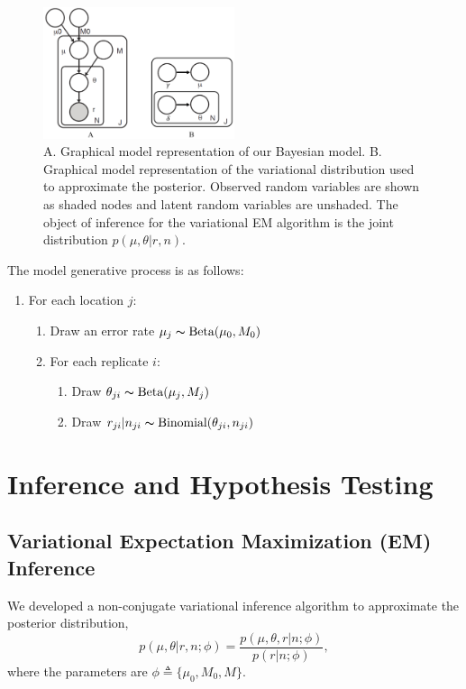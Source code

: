 \documentclass[11pt,reqno]{amsart}
\begin{document}
\begin{figure}[htpb]
\centering
\includegraphics[width=0.5\textwidth]{figs/rvd3_model.png}
\caption{A. Graphical model representation of our Bayesian model.
B. Graphical model representation of the variational distribution used to approximate the posterior.
Observed random variables are shown as shaded nodes and latent random variables are unshaded.
The object of inference for the variational EM algorithm is the joint distribution $p(\mu, \theta|r, n)$.}
\label{tbl:graphical_model}
\end{figure}
The model generative process is as follows:
\begin{enumerate}[noitemsep]
	\item For each location $j$:
	\begin{enumerate}
		\item Draw an error rate $\mu_j \thicksim \text{Beta}(\mu_0, M_0)$
		\item For each replicate $i$:
		\begin{enumerate}
			\item Draw $\theta_{ji} \thicksim \text{Beta}(\mu_j, M_j)$
			\item Draw $r_{ji} | n_{ji} \thicksim \text{Binomial}(\theta_{ji}, n_{ji})$
		\end{enumerate}
	\end{enumerate}
\end{enumerate}

\section{Inference and Hypothesis Testing}
\subsection{Variational Expectation Maximization (EM) Inference}
We developed a non-conjugate variational inference algorithm to approximate the posterior distribution,
\begin{equation}
	p(\mu, \theta | r, n; \phi)  = \frac{ p(\mu, \theta, r | n; \phi) } {p ( r | n; \phi)},
\end{equation}
where the parameters are $\phi \triangleq \{\mu_0, M_0, M\}$.
\end{document}
